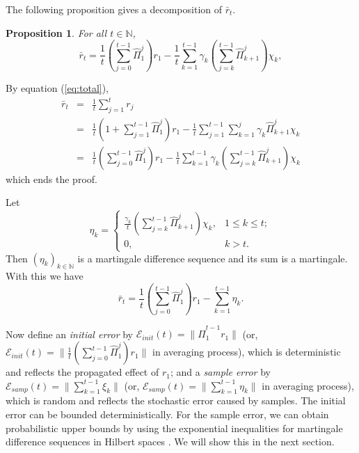 \documentclass[twoside,twocolumn,journal]{IEEEtran}
\newtheorem{prop}[thm]{Proposition}
\newenvironment{pf}[1][Proof]{\medskip\noindent\hspace{1em}{\itshape #1: }}{\hspace*{\fill}~\QED\par\endtrivlist\medskip}
\newcommand{\DS}{\displaystyle}
\def\N{{\mathbb N}}
\def\Err{{\mathscr E}}
\begin{document}
The following proposition gives a decomposition of $\bar{r}_t$.

\medskip

\begin{prop} For all $t\in \N$,
\begin{equation}
\bar{r}_{t} = \frac{1}{t}\left(\sum_{j=0}^{t-1} \hat{\Pi}_1^j \right)
r_1 - \frac{1}{t}\sum_{k=1}^{t-1}\gamma_k \left( \sum_{j=k}^{t-1} \hat{\Pi}_{k+1}^j \right)\chi_k,
\end{equation}
\end{prop}

\begin{pf} By equation (\ref{eq:total}),
\begin{eqnarray*}
\bar{r}_{t} & = & \frac{1}{t} \sum_{j=1}^{t} r_j \\
& = & \frac{1}{t}\left(1+\sum_{j=1}^{t-1} \hat{\Pi}_1^j \right) r_1 -
\frac{1}{t}\sum_{j=1}^{t-1} \sum_{k=1}^{j} \gamma_k \hat{\Pi}_{k+1}^j \chi_k \\
& = & \frac{1}{t}\left(\sum_{j=0}^{t-1} \hat{\Pi}_1^j \right) r_1 -
\frac{1}{t}\sum_{k=1}^{t-1}\gamma_k \left( \sum_{j=k}^{t-1} \hat{\Pi}_{k+1}^j \right)\chi_k
\end{eqnarray*}
which ends the proof.
\end{pf}

Let
\[ \eta_k =
\left\{
\begin{array}{ll}
\DS \frac{\gamma_k}{t} (\sum_{j=k}^{t-1} \hat{\Pi}_{k+1}^j)\chi_k, & 1\leq k \leq t; \\
0, & k>t.
\end{array}
\right.
\]
Then $(\eta_k)_{k\in \N}$ is a martingale difference sequence and its sum is a martingale. With this we have
\begin{equation} \label{eq:avgtotal1}
\bar{r}_{t} = \frac{1}{t}\left(\sum_{j=0}^{t-1} \hat{\Pi}_1^j \right) r_1 - \sum_{k=1}^{t-1}\eta_k.
\end{equation}


Now define an \emph{initial error} by $\Err_{init}(t) = \|\hat{\Pi}_1^{t-1} r_1 \|$
(or, $\Err_{init}(t) = \|\frac{1}{t}\left(\sum_{j=0}^{t-1} \hat{\Pi}_1^j \right)
r_1 \|$ in averaging process), which is deterministic and reflects the propagated effect of $r_1$;
and a \emph{sample error} by $\Err_{samp}(t) = \|\sum_{k=1}^{t-1} \xi_k\|$
(or, $\Err_{samp}(t) = \|\sum_{k=1}^{t-1}\eta_k\|$ in averaging process), which is random
and reflects the stochastic error caused by samples. The initial error can be bounded deterministically.
For the sample error, we can obtain probabilistic upper bounds by using the exponential inequalities for martingale
difference sequences in Hilbert spaces \cite{Pinelis94}. We will show this in the next section.
\end{document}
